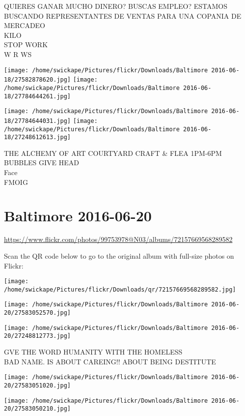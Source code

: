 \documentclass[10pt,letterpaper]{article}
\begin{document}
QUIERES GANAR MUCHO DINERO?  BUSCAS EMPLEO?  ESTAMOS BUSCANDO REPRESENTANTES DE VENTAS PARA UNA COPANIA DE MERCADEO\\
KILO\\
STOP WORK\\
W R WS
\pagebreak

\texttt{[image: /home/swickape/Pictures/flickr/Downloads/Baltimore 2016-06-18/27582878620.jpg]}
\texttt{[image: /home/swickape/Pictures/flickr/Downloads/Baltimore 2016-06-18/27784644261.jpg]}

\texttt{[image: /home/swickape/Pictures/flickr/Downloads/Baltimore 2016-06-18/27784644031.jpg]}
\texttt{[image: /home/swickape/Pictures/flickr/Downloads/Baltimore 2016-06-18/27248612613.jpg]}

THE ALCHEMY OF ART COURTYARD CRAFT \& FLEA 1PM{-}6PM\\
BUBBLES GIVE HEAD\\
Face\\
FMOIG
\pagebreak

\section*{Baltimore 2016-06-20}

\url{https://www.flickr.com/photos/99753978@N03/albums/72157669568289582}

Scan the QR code below to go to the original album with full-size photos on Flickr:

\texttt{[image: /home/swickape/Pictures/flickr/Downloads/qr/72157669568289582.jpg]}
\pagebreak

\texttt{[image: /home/swickape/Pictures/flickr/Downloads/Baltimore 2016-06-20/27583052570.jpg]}

\vspace{0.25in}
\texttt{[image: /home/swickape/Pictures/flickr/Downloads/Baltimore 2016-06-20/27248812773.jpg]}

GVE THE WORD HUMANITY WITH THE HOMELESS\\
BAD NAME.  IS ABOUT CAREING!! ABOUT BEING DESTITUTE
\pagebreak

\texttt{[image: /home/swickape/Pictures/flickr/Downloads/Baltimore 2016-06-20/27583051020.jpg]}

\vspace{0.25in}
\texttt{[image: /home/swickape/Pictures/flickr/Downloads/Baltimore 2016-06-20/27583050210.jpg]}
\end{document}
